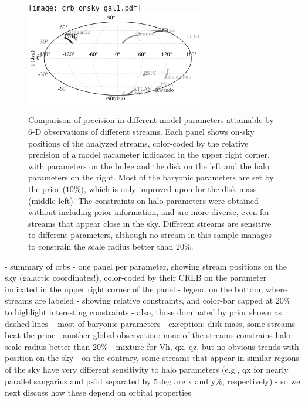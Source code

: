 \documentclass[modern]{aastex61}
\begin{document}
\begin{figure}
\begin{center}
\texttt{[image: crb\_onsky\_gal1.pdf]}
\includegraphics[width=0.7\textwidth]{sky_legend_gal1.pdf}
\caption{Comparison of precision in different model parameters attainable by 6-D observations of different streams.
Each panel shows on-sky positions of the analyzed streams, color-coded by the relative precision of a model parameter indicated in the upper right corner, with parameters on the bulge and the disk on the left and the halo parameters on the right.
Most of the baryonic parameters are set by the prior ($10\%$), which is only improved upon for the disk mass (middle left).
The constraints on halo parameters were obtained without including prior information, and are more diverse, even for streams that appear close in the sky.
Different streams are sensitive to different parameters, although no stream in this sample manages to constrain the scale radius better than $20\%$.
}
\label{fig:sky_precision}
\end{center}
\end{figure}

- summary of crbs
- one panel per parameter, showing stream positions on the sky (galactic coordinates!), color-coded by their CRLB on the parameter indicated in the upper right corner of the panel
- legend on the bottom, where streams are labeled
- showing relative constraints, and color-bar capped at 20\% to highlight interesting constraints
- also, those dominated by prior shown as dashed lines -- most of baryonic parameters
- exception: disk mass, some streams beat the prior
- another global observation: none of the streams constrains halo scale radius better than 20\%
- mixture for Vh, qx, qz, but no obvious trends with position on the sky
- on the contrary, some streams that appear in similar regions of the sky have very different sensitivity to halo parameters (e.g., qx for nearly parallel sangarius and ps1d separated by 5\,deg are x and y\%, respectively)
- so we next discuss how these depend on orbital properties
\end{document}
